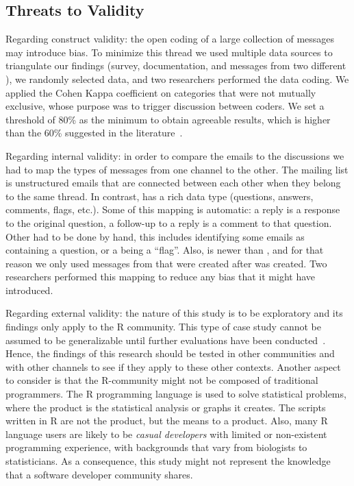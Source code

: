 

\subsection{Threats to Validity}
\label{cha:threats}


Regarding construct validity: the open coding of a large collection of messages may introduce bias.  To minimize this thread we used multiple data sources to
triangulate our findings (survey, documentation, and messages from two different \channels), we randomly selected data, and two researchers
performed the data coding. We applied the Cohen Kappa coefficient on categories that were not mutually exclusive, whose purpose was to trigger discussion
between coders.  We set a threshold of 80\% as the minimum to obtain agreeable results, which is higher than the 60\% suggested in the
literature~\cite{Landis1977}. 

Regarding internal validity: in order to compare the emails to the \SO discussions we had to map the types of messages from one channel to the
other. The \RH mailing list is unstructured emails that are connected between each other when they belong to the same thread. In contrast, \SO has a rich
data type (questions, answers, comments, flags, etc.). Some of this mapping is automatic: a reply is a response to the original question, a follow-up to a reply
is a comment to that question. Other had to be done by hand, this includes identifying some emails as containing a question, or a being a ``flag''.
Also, \SO is newer than \RH, and for that reason we only used messages from \RH that were created after \SO was created.
Two researchers performed this mapping to reduce any bias that it might have  introduced.


Regarding external validity: the nature of this study is to be exploratory and its findings only apply to the R community.
This type of case study cannot be assumed to be generalizable until further evaluations have been conducted~\cite{Yin2009}.
    Hence, the findings of this research should be tested in other communities and with other channels to see if they apply to these other contexts.
Another aspect to consider is that the R-community might not be composed of traditional programmers.
    The R programming language is used to solve statistical problems, where the product is the statistical analysis or graphs it creates. The scripts written in
    R are not the product, but the means to a product.
    Also, many R language users are likely to be \textit{casual developers} with limited or non-existent programming experience, with backgrounds that vary from
    biologists to statisticians. As a consequence, this study might not represent the knowledge that a software developer community shares. 

